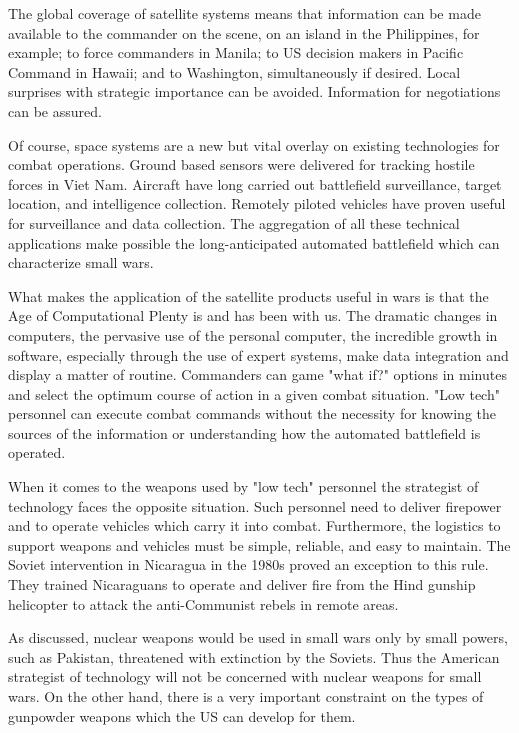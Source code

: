 The global coverage of satellite systems means that information can be made available to the commander on the scene, on an island in the Philippines, for example; to force commanders in Manila; to US decision makers in Pacific Command in Hawaii; and to Washington, simultaneously if desired. Local surprises with strategic importance can be avoided. Information for negotiations can be assured.

Of course, space systems are a new but vital overlay on existing technologies for combat operations. Ground based sensors were delivered for tracking hostile forces in Viet Nam. Aircraft have long carried out battlefield surveillance, target location, and intelligence collection. Remotely piloted vehicles have proven useful for surveillance and data collection. The aggregation of all these technical applications make possible the long-anticipated automated battlefield which can characterize small wars.

What makes the application of the satellite products useful in wars is that the Age of Computational Plenty is and has been with us. The dramatic changes in computers, the pervasive use of the personal computer, the incredible growth in software, especially through the use of expert systems, make data integration and display a matter of routine. Commanders can game "what if?" options in minutes and select the optimum course of action in a given combat situation. "Low tech" personnel can execute combat commands without the necessity for knowing the sources of the information or understanding how the automated battlefield is operated.

When it comes to the weapons used by "low tech" personnel the strategist of technology faces the opposite situation. Such personnel need to deliver firepower and to operate vehicles which carry it into combat. Furthermore, the logistics to support weapons and vehicles must be simple, reliable, and easy to maintain. The Soviet intervention in Nicaragua in the 1980s proved an exception to this rule. They trained Nicaraguans to operate and deliver fire from the Hind gunship helicopter to attack the anti-Communist rebels in remote areas.

As discussed, nuclear weapons would be used in small wars only by small powers, such as Pakistan, threatened with extinction by the Soviets. Thus the American strategist of technology will not be concerned with nuclear weapons for small wars. On the other hand, there is a very important constraint on the types of gunpowder weapons which the US can develop for them.

